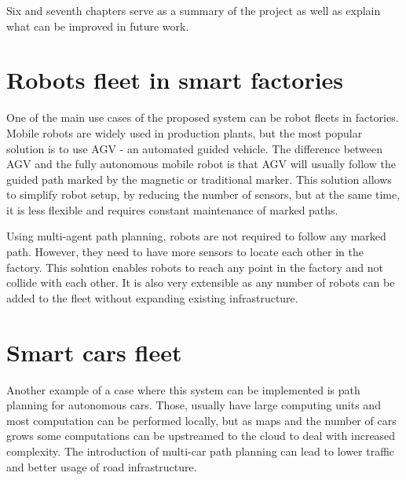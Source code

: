 Six and  seventh chapters serve as a summary of the project as well as explain what can be improved in future work.

\section{Robots fleet in smart factories}
One of the main use cases of the proposed system can be robot fleets in factories. Mobile robots are widely used in production plants, but the most popular solution is to use AGV - an automated guided vehicle\cite{agv}. The difference between AGV and the fully autonomous mobile robot is that AGV will usually follow the guided path marked by the magnetic or traditional marker. This solution allows to simplify robot setup, by reducing the number of sensors, but at the same time, it is less flexible and requires constant maintenance of marked paths.

Using multi-agent path planning, robots are not required to follow any marked path. However, they need to have more sensors to locate each other in the factory. This solution enables robots to reach any point in the factory and not collide with each other. It is also very extensible as any number of robots can be added to the fleet without expanding existing infrastructure.

\section{Smart cars fleet}

Another example of a case where this system can be implemented is path planning for autonomous cars. Those, usually have large computing units and most computation can be performed locally, but as maps and the number of cars grows some computations can be upstreamed to the cloud to deal with increased complexity. The introduction of multi-car path planning can lead to lower traffic and better usage of road infrastructure.